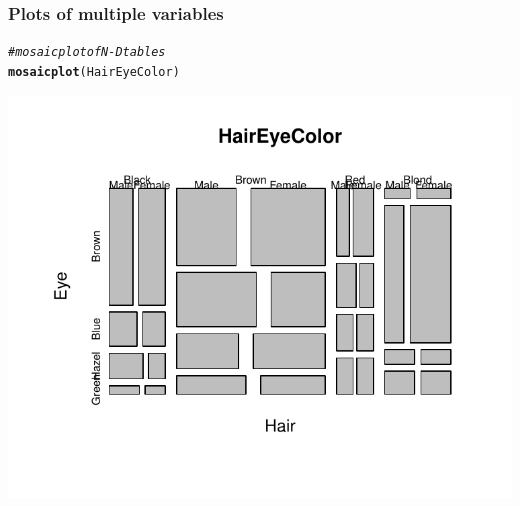 \documentclass[12pt]{beamer}\usepackage[]{graphicx}\usepackage[]{color}
\makeatletter
\newcommand{\hlcom}[1]{\textcolor[rgb]{0.678,0.584,0.686}{\textit{#1}}}%
\newcommand{\hlstd}[1]{\textcolor[rgb]{0.345,0.345,0.345}{#1}}%
\newcommand{\hlkwd}[1]{\textcolor[rgb]{0.737,0.353,0.396}{\textbf{#1}}}%
\newenvironment{kframe}{%
 \def\at@end@of@kframe{}%
 \ifinner\ifhmode%
  \def\at@end@of@kframe{\end{minipage}}%
  \begin{minipage}{\columnwidth}%
 \fi\fi%
 \def\FrameCommand##1{\hskip\@totalleftmargin \hskip-\fboxsep
 \colorbox{shadecolor}{##1}\hskip-\fboxsep
     \hskip-\linewidth \hskip-\@totalleftmargin \hskip\columnwidth}%
 \MakeFramed {\advance\hsize-\width
   \@totalleftmargin\z@ \linewidth\hsize
   \@setminipage}}%
 {\par\unskip\endMakeFramed%
 \at@end@of@kframe}
\newenvironment{knitrout}{}{} %
\makeatother
\begin{document}

\begin{frame}[fragile]
\frametitle{Plots of multiple variables}
\begin{knitrout}\footnotesize
{}\color{fgcolor}\begin{kframe}
\begin{alltt}
\hlcom{# mosaic plot of N-D tables}
\hlkwd{mosaicplot}\hlstd{(HairEyeColor)}
\end{alltt}
\end{kframe}

{\centering \includegraphics[width=.75\linewidth,height=.65\linewidth]{figure/unnamed-chunk-26-1} 

}



\end{knitrout}
\end{frame}

\end{document}
